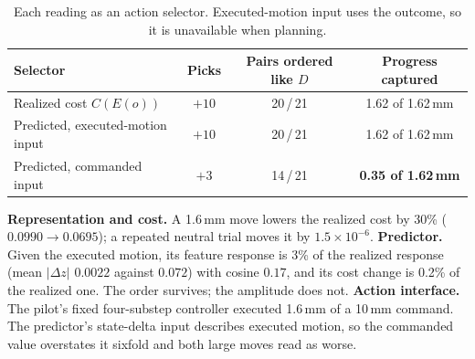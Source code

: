 \documentclass[10pt]{article}
\begin{document}
\begin{table}[H]\centering\small
\setlength{\tabcolsep}{7pt}
\begin{tabular}{@{}lccc@{}}
\toprule
Selector & Picks & Pairs ordered like $D$ & Progress captured \\
\midrule
Realized cost $C(E(o))$ & $+10$ & 20\,/\,21 & 1.62 of 1.62\,mm \\
Predicted, executed-motion input & $+10$ & 20\,/\,21 & 1.62 of 1.62\,mm \\
Predicted, commanded input & $+3$ & 14\,/\,21 & \textcolor{bad}{\textbf{0.35 of 1.62\,mm}} \\
\bottomrule
\end{tabular}
\caption{Each reading as an action selector. Executed-motion input uses the outcome, so it is unavailable when planning.}
\label{tab:rank}
\end{table}

\textbf{Representation and cost.} A 1.6\,mm move lowers the realized cost by 30\% ($0.0990\to0.0695$); a
repeated neutral trial moves it by $1.5\times10^{-6}$. \textbf{Predictor.} Given the executed motion, its
feature response is 3\% of the realized response (mean $|\Delta z|$ $0.0022$ against $0.072$) with cosine
$0.17$, and its cost change is 0.2\% of the realized one. The order survives; the amplitude does not.
\textbf{Action interface.} The pilot's fixed four-substep controller executed 1.6\,mm of a 10\,mm command.
The predictor's state-delta input describes executed motion, so the commanded value overstates it sixfold and
both large moves read as worse.
\end{document}
